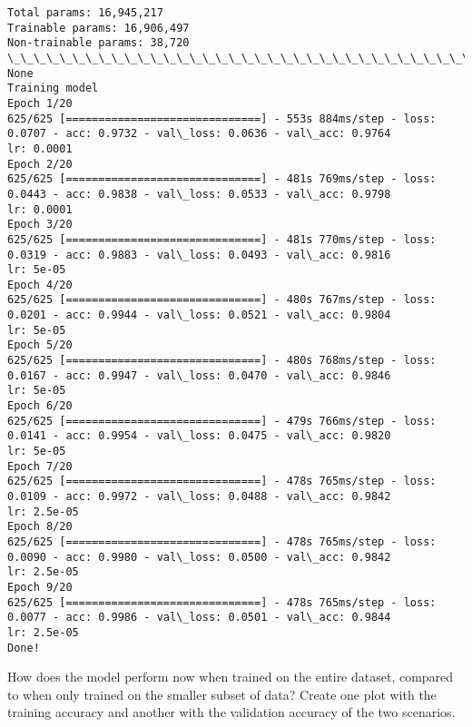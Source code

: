 \documentclass[11pt]{article}
\begin{document}
\begin{Verbatim}[commandchars=\\\{\}]
Total params: 16,945,217
Trainable params: 16,906,497
Non-trainable params: 38,720
\_\_\_\_\_\_\_\_\_\_\_\_\_\_\_\_\_\_\_\_\_\_\_\_\_\_\_\_\_\_\_\_\_\_\_\_\_\_\_\_\_\_\_\_\_\_\_\_\_\_\_\_\_\_\_\_\_\_\_\_\_\_\_\_\_
None
Training model
Epoch 1/20
625/625 [==============================] - 553s 884ms/step - loss: 0.0707 - acc: 0.9732 - val\_loss: 0.0636 - val\_acc: 0.9764
lr: 0.0001
Epoch 2/20
625/625 [==============================] - 481s 769ms/step - loss: 0.0443 - acc: 0.9838 - val\_loss: 0.0533 - val\_acc: 0.9798
lr: 0.0001
Epoch 3/20
625/625 [==============================] - 481s 770ms/step - loss: 0.0319 - acc: 0.9883 - val\_loss: 0.0493 - val\_acc: 0.9816
lr: 5e-05
Epoch 4/20
625/625 [==============================] - 480s 767ms/step - loss: 0.0201 - acc: 0.9944 - val\_loss: 0.0521 - val\_acc: 0.9804
lr: 5e-05
Epoch 5/20
625/625 [==============================] - 480s 768ms/step - loss: 0.0167 - acc: 0.9947 - val\_loss: 0.0470 - val\_acc: 0.9846
lr: 5e-05
Epoch 6/20
625/625 [==============================] - 479s 766ms/step - loss: 0.0141 - acc: 0.9954 - val\_loss: 0.0475 - val\_acc: 0.9820
lr: 5e-05
Epoch 7/20
625/625 [==============================] - 478s 765ms/step - loss: 0.0109 - acc: 0.9972 - val\_loss: 0.0488 - val\_acc: 0.9842
lr: 2.5e-05
Epoch 8/20
625/625 [==============================] - 478s 765ms/step - loss: 0.0090 - acc: 0.9980 - val\_loss: 0.0500 - val\_acc: 0.9842
lr: 2.5e-05
Epoch 9/20
625/625 [==============================] - 478s 765ms/step - loss: 0.0077 - acc: 0.9986 - val\_loss: 0.0501 - val\_acc: 0.9844
lr: 2.5e-05
Done!

    \end{Verbatim}

    How does the model perform now when trained on the entire dataset,
compared to when only trained on the smaller subset of data? Create one
plot with the training accuracy and another with the validation accuracy
of the two scenarios.
\end{document}
